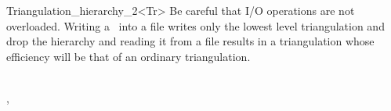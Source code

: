 \begin{ccRefClass}{Triangulation_hierarchy_2<Tr>}
Be careful that I/O operations are not overloaded.
Writing a \ccRefName\  into a file
writes only the lowest level triangulation and drop the hierarchy
and reading it from a file results in a triangulation
whose efficiency will be that of an ordinary triangulation.


\ccSeeAlso
{} \\
, \\


\end{ccRefClass}


